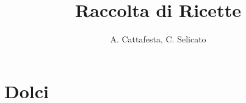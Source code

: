 \documentclass[12pt, oneside]{book}
\newcommand{\parttitle}{}
\let\oldpart\part
\renewcommand{\part}[1]{%
  \def\parttitle{#1}%
  \oldpart{#1}%
}
\begin{document}
\title{Raccolta di Ricette}
\author{A. Cattafesta, C. Selicato}
\date{}

\maketitle
\tableofcontents
\part{Dolci}



\newpage

\end{document}
